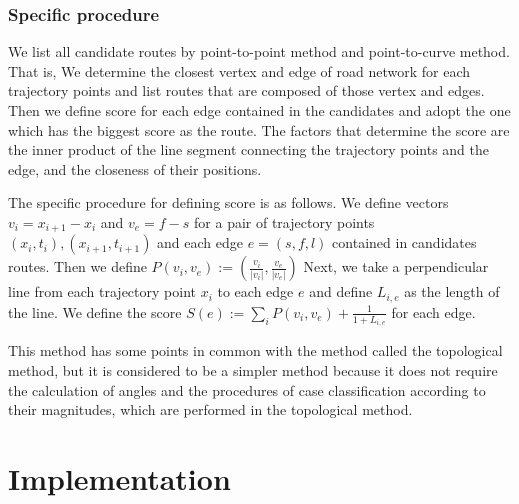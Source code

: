 \documentclass{article}
\numberwithin{equation}{section}
\theoremstyle{definition}
\begin{document}
\subsubsection{Specific procedure}
We list all candidate routes by point-to-point method and point-to-curve method.
That is, We determine the closest vertex and edge of road network for each trajectory points and list routes that are composed of those vertex and edges.
Then we define score for each edge contained in the candidates and adopt the one which has the biggest score as the route.  
The factors that determine the score are the inner product of the line segment connecting the trajectory points and the edge, and the closeness of their positions.

The specific procedure for defining score is as follows.
We define vectors $v_{i} = x_{i+1}-x_{i}$ and $v_{e} = f-s$ for a pair of trajectory points $(x_{i}, t_{i}), (x_{i+1}, t_{i+1})$ and each edge $e = (s,f,l)$ contained in candidates routes.
Then we define $P(v_{i}, v_{e}) := (\frac{v_{i}}{|v_{i}|}, \frac{v_{e}}{|v_{e}|})$
Next, we take a perpendicular line from each trajectory point $x_{i}$ to each edge $e$ and define $L_{i,e}$ as the length of the line.
We define the score $S(e) := \sum_{i}P(v_{i}, v_{e}) + \frac{1}{1+L_{i,e}}$ for each edge.

This method has some points in common with the method called the topological method, but it is considered to be a simpler method because it does not require the calculation of angles and the procedures of case classification according to their magnitudes, which are performed in the topological method.



\section{Implementation}
\end{document}
